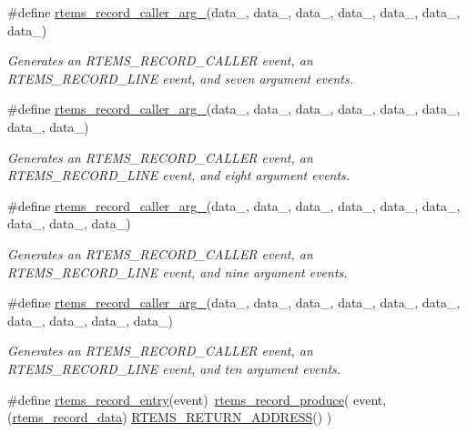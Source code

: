 \begin{DoxyCompactItemize}
\#define \mbox{\hyperlink{group__RTEMSRecord_gaca7d1e6c859b2d6ddb393b97ab07ef52}{rtems\+\_\+record\+\_\+caller\+\_\+arg\+\_}}(data\+\_,  data\+\_,  data\+\_,  data\+\_,  data\+\_,  data\+\_,  data\+\_)
\begin{DoxyCompactList}\small\item\em Generates an R\+T\+E\+M\+S\+\_\+\+R\+E\+C\+O\+R\+D\+\_\+\+C\+A\+L\+L\+ER event, an R\+T\+E\+M\+S\+\_\+\+R\+E\+C\+O\+R\+D\+\_\+\+L\+I\+NE event, and seven argument events. \end{DoxyCompactList}\item 
\#define \mbox{\hyperlink{group__RTEMSRecord_ga3a72a086d549c7ec22735317d36014bf}{rtems\+\_\+record\+\_\+caller\+\_\+arg\+\_}}(data\+\_,  data\+\_,  data\+\_,  data\+\_,  data\+\_,  data\+\_,  data\+\_,  data\+\_)
\begin{DoxyCompactList}\small\item\em Generates an R\+T\+E\+M\+S\+\_\+\+R\+E\+C\+O\+R\+D\+\_\+\+C\+A\+L\+L\+ER event, an R\+T\+E\+M\+S\+\_\+\+R\+E\+C\+O\+R\+D\+\_\+\+L\+I\+NE event, and eight argument events. \end{DoxyCompactList}\item 
\#define \mbox{\hyperlink{group__RTEMSRecord_ga4f4a7ccb2ecb5ffe9fb616f28723390a}{rtems\+\_\+record\+\_\+caller\+\_\+arg\+\_}}(data\+\_,  data\+\_,  data\+\_,  data\+\_,  data\+\_,  data\+\_,  data\+\_,  data\+\_,  data\+\_)
\begin{DoxyCompactList}\small\item\em Generates an R\+T\+E\+M\+S\+\_\+\+R\+E\+C\+O\+R\+D\+\_\+\+C\+A\+L\+L\+ER event, an R\+T\+E\+M\+S\+\_\+\+R\+E\+C\+O\+R\+D\+\_\+\+L\+I\+NE event, and nine argument events. \end{DoxyCompactList}\item 
\#define \mbox{\hyperlink{group__RTEMSRecord_ga6ec65a3a626d178e21d386a68b87ef9f}{rtems\+\_\+record\+\_\+caller\+\_\+arg\+\_}}(data\+\_,  data\+\_,  data\+\_,  data\+\_,  data\+\_,  data\+\_,  data\+\_,  data\+\_,  data\+\_,  data\+\_)
\begin{DoxyCompactList}\small\item\em Generates an R\+T\+E\+M\+S\+\_\+\+R\+E\+C\+O\+R\+D\+\_\+\+C\+A\+L\+L\+ER event, an R\+T\+E\+M\+S\+\_\+\+R\+E\+C\+O\+R\+D\+\_\+\+L\+I\+NE event, and ten argument events. \end{DoxyCompactList}\item 
\#define \mbox{\hyperlink{group__RTEMSRecord_gaebb24b5708bdc53200069ecace1be042}{rtems\+\_\+record\+\_\+entry}}(event)~\mbox{\hyperlink{group__RTEMSRecord_ga136d81367324d6729819192181ea68bb}{rtems\+\_\+record\+\_\+produce}}( event, (\mbox{\hyperlink{group__RTEMSRecord_gab483bd3ec735835dac6788b78c817eab}{rtems\+\_\+record\+\_\+data}}) \mbox{\hyperlink{group__RTEMSScoreBaseDefs_ga70a1b8869a1ec49d30613af22ebc3f50}{R\+T\+E\+M\+S\+\_\+\+R\+E\+T\+U\+R\+N\+\_\+\+A\+D\+D\+R\+E\+SS}}() )

\end{DoxyCompactItemize}
